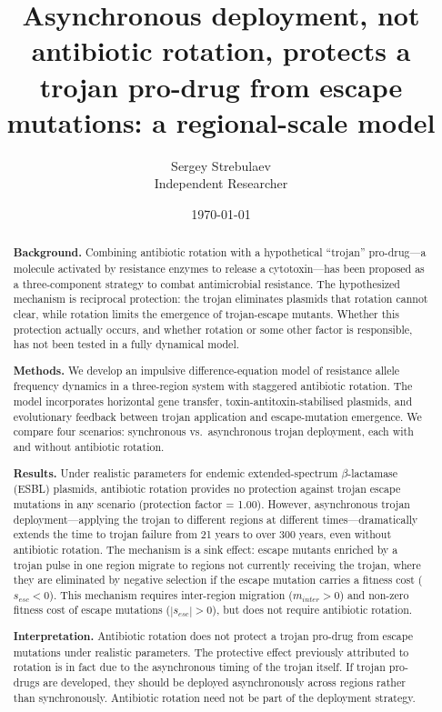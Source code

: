 \documentclass[12pt,a4paper]{article}
\title{\textbf{Asynchronous deployment, not antibiotic rotation, protects a trojan pro-drug from escape mutations: a regional-scale model}}
\author{Sergey Strebulaev\\
Independent Researcher}
\date{\today}
\begin{document}
\maketitle

\begin{abstract}
\textbf{Background.} Combining antibiotic rotation with a hypothetical ``trojan'' pro-drug---a molecule activated by resistance enzymes to release a cytotoxin---has been proposed as a three-component strategy to combat antimicrobial resistance. The hypothesized mechanism is reciprocal protection: the trojan eliminates plasmids that rotation cannot clear, while rotation limits the emergence of trojan-escape mutants. Whether this protection actually occurs, and whether rotation or some other factor is responsible, has not been tested in a fully dynamical model.

\textbf{Methods.} We develop an impulsive difference-equation model of resistance allele frequency dynamics in a three-region system with staggered antibiotic rotation. The model incorporates horizontal gene transfer, toxin-antitoxin-stabilised plasmids, and evolutionary feedback between trojan application and escape-mutation emergence. We compare four scenarios: synchronous vs.\ asynchronous trojan deployment, each with and without antibiotic rotation.

\textbf{Results.} Under realistic parameters for endemic extended-spectrum $\beta$-lactamase (ESBL) plasmids, antibiotic rotation provides no protection against trojan escape mutations in any scenario (protection factor = 1.00). However, asynchronous trojan deployment---applying the trojan to different regions at different times---dramatically extends the time to trojan failure from 21 years to over 300 years, even without antibiotic rotation. The mechanism is a sink effect: escape mutants enriched by a trojan pulse in one region migrate to regions not currently receiving the trojan, where they are eliminated by negative selection if the escape mutation carries a fitness cost ($s_{esc} < 0$). This mechanism requires inter-region migration ($m_{inter} > 0$) and non-zero fitness cost of escape mutations ($|s_{esc}| > 0$), but does not require antibiotic rotation.

\textbf{Interpretation.} Antibiotic rotation does not protect a trojan pro-drug from escape mutations under realistic parameters. The protective effect previously attributed to rotation is in fact due to the asynchronous timing of the trojan itself. If trojan pro-drugs are developed, they should be deployed asynchronously across regions rather than synchronously. Antibiotic rotation need not be part of the deployment strategy.
\end{abstract}
\end{document}
